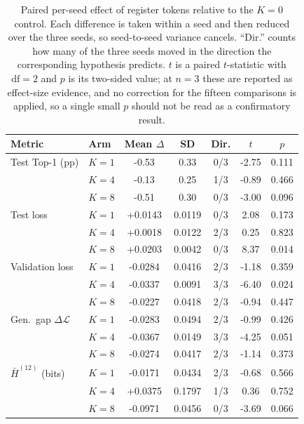 \begin{table}[t]
\centering
\caption{Paired per-seed effect of register tokens relative to the $K=0$ control. Each difference is taken within a seed and then reduced over the three seeds, so seed-to-seed variance cancels. ``Dir.'' counts how many of the three seeds moved in the direction the corresponding hypothesis predicts. $t$ is a paired $t$-statistic with $\mathrm{df}=2$ and $p$ is its two-sided value; at $n=3$ these are reported as effect-size evidence, and no correction for the fifteen comparisons is applied, so a single small $p$ should not be read as a confirmatory result.}
\label{tab:paired_effects}
\setlength{\tabcolsep}{3pt}
\footnotesize
\begin{tabular}{llccccc}
\toprule
\textbf{Metric} & \textbf{Arm} & \textbf{Mean $\Delta$} & \textbf{SD} & \textbf{Dir.} & \textbf{$t$} & \textbf{$p$} \\
\midrule
Test Top-1 (pp) & $K=1$ & -0.53 & 0.33 & 0/3 & -2.75 & 0.111 \\
 & $K=4$ & -0.13 & 0.25 & 1/3 & -0.89 & 0.466 \\
 & $K=8$ & -0.51 & 0.30 & 0/3 & -3.00 & 0.096 \\
\midrule
Test loss & $K=1$ & +0.0143 & 0.0119 & 0/3 & 2.08 & 0.173 \\
 & $K=4$ & +0.0018 & 0.0122 & 2/3 & 0.25 & 0.823 \\
 & $K=8$ & +0.0203 & 0.0042 & 0/3 & 8.37 & 0.014 \\
\midrule
Validation loss & $K=1$ & -0.0284 & 0.0416 & 2/3 & -1.18 & 0.359 \\
 & $K=4$ & -0.0337 & 0.0091 & 3/3 & -6.40 & 0.024 \\
 & $K=8$ & -0.0227 & 0.0418 & 2/3 & -0.94 & 0.447 \\
\midrule
Gen.\ gap $\Delta\mathcal{L}$ & $K=1$ & -0.0283 & 0.0494 & 2/3 & -0.99 & 0.426 \\
 & $K=4$ & -0.0367 & 0.0149 & 3/3 & -4.25 & 0.051 \\
 & $K=8$ & -0.0274 & 0.0417 & 2/3 & -1.14 & 0.373 \\
\midrule
$\bar{H}^{(12)}$ (bits) & $K=1$ & -0.0171 & 0.0434 & 2/3 & -0.68 & 0.566 \\
 & $K=4$ & +0.0375 & 0.1797 & 1/3 & 0.36 & 0.752 \\
 & $K=8$ & -0.0971 & 0.0456 & 0/3 & -3.69 & 0.066 \\
\bottomrule
\end{tabular}
\end{table}
